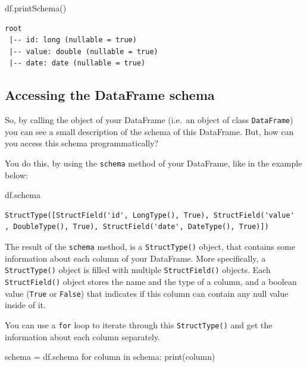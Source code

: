 \documentclass[
  11pt,
  letterpaper,
  DIV=11,
  numbers=noendperiod]{scrreprt}
\newenvironment{Shaded}{\begin{snugshade}}{\end{snugshade}}
\newcommand{\BuiltInTok}[1]{\textcolor[rgb]{0.00,0.23,0.31}{#1}}
\newcommand{\ControlFlowTok}[1]{\textcolor[rgb]{0.00,0.23,0.31}{#1}}
\newcommand{\KeywordTok}[1]{\textcolor[rgb]{0.00,0.23,0.31}{#1}}
\newcommand{\NormalTok}[1]{\textcolor[rgb]{0.00,0.23,0.31}{#1}}
\newcommand{\OperatorTok}[1]{\textcolor[rgb]{0.37,0.37,0.37}{#1}}
\begin{document}
\begin{Shaded}
\begin{Highlighting}[]
\NormalTok{df.printSchema()}
\end{Highlighting}
\end{Shaded}

\begin{verbatim}
root
 |-- id: long (nullable = true)
 |-- value: double (nullable = true)
 |-- date: date (nullable = true)
\end{verbatim}

\hypertarget{accessing-the-dataframe-schema}{%
\subsection{Accessing the DataFrame
schema}\label{accessing-the-dataframe-schema}}

So, by calling the object of your DataFrame (i.e.~an object of class
\texttt{DataFrame}) you can see a small description of the schema of
this DataFrame. But, how can you access this schema programmatically?

You do this, by using the \texttt{schema} method of your DataFrame, like
in the example below:

\begin{Shaded}
\begin{Highlighting}[]
\NormalTok{df.schema}
\end{Highlighting}
\end{Shaded}

\begin{verbatim}
StructType([StructField('id', LongType(), True), StructField('value'
, DoubleType(), True), StructField('date', DateType(), True)])
\end{verbatim}

The result of the \texttt{schema} method, is a \texttt{StructType()}
object, that contains some information about each column of your
DataFrame. More specifically, a \texttt{StructType()} object is filled
with multiple \texttt{StructField()} objects. Each
\texttt{StructField()} object stores the name and the type of a column,
and a boolean value (\texttt{True} or \texttt{False}) that indicates if
this column can contain any null value inside of it.

You can use a \texttt{for} loop to iterate through this
\texttt{StructType()} and get the information about each column
separately.

\begin{Shaded}
\begin{Highlighting}[]
\NormalTok{schema }\OperatorTok{=}\NormalTok{ df.schema}
\ControlFlowTok{for}\NormalTok{ column }\KeywordTok{in}\NormalTok{ schema:}
  \BuiltInTok{print}\NormalTok{(column)}
\end{Highlighting}
\end{Shaded}
\end{document}
